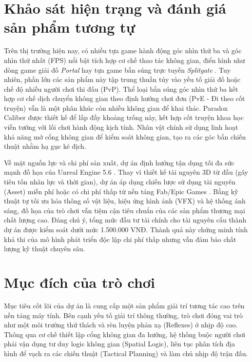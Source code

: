 \documentclass[../DoAn.tex]{subfiles}
\begin{document}
\section{Khảo sát hiện trạng và đánh giá sản phẩm tương tự}
\label{section:2.1}
Trên thị trường hiện nay, có nhiều tựa game hành động góc nhìn thứ ba và góc nhìn thứ nhất (FPS) nổi bật tích hợp cơ chế thao tác không gian, điển hình như dòng game giải đố \textit{Portal} \cite{MetacriticPortal} hay tựa game bắn súng trực tuyến \textit{Splitgate} \cite{MetacriticSplitgate}. Tuy nhiên, phần lớn các sản phẩm này tập trung thuần túy vào yếu tố giải đố hoặc chế độ nhiều người chơi thi đấu (PvP). Thể loại bắn súng góc nhìn thứ ba kết hợp cơ chế dịch chuyển không gian theo định hướng chơi đơn (PvE - Đi theo cốt truyện) vẫn là một phân khúc còn nhiều không gian để khai thác. Paradox Caliber được thiết kế để lấp đầy khoảng trống này, kết hợp cốt truyện khoa học viễn tưởng với lối chơi hành động kịch tính. Nhân vật chính sử dụng linh hoạt khả năng mở cổng không gian để kiểm soát không gian, tạo ra các góc bắn chiến thuật nhằm hạ gục kẻ địch.

Về mặt nguồn lực và chi phí sản xuất, dự án định hướng tận dụng tối đa sức mạnh đồ họa của Unreal Engine 5.6 \cite{UE56Doc}. Thay vì thiết kế tài nguyên 3D từ đầu (gây tiêu tốn nhân lực và thời gian), dự án áp dụng chiến lược sử dụng tài nguyên (Asset) miễn phí hoặc có chi phí thấp từ nền tảng Fab/Epic Games \cite{EpicFab}. Bằng kỹ thuật tự tối ưu hóa thông số vật liệu, hiệu ứng hình ảnh (VFX) và hệ thống ánh sáng, đồ họa của trò chơi vẫn tiệm cận tiêu chuẩn của các sản phẩm thương mại chất lượng cao. Đáng chú ý, tổng mức đầu tư tài chính cho tài nguyên cấu thành dự án được kiểm soát dưới mức 1.500.000 VNĐ. Thành quả này chứng minh tính khả thi của mô hình phát triển độc lập chi phí thấp nhưng vẫn đảm bảo chất lượng kỹ thuật chuyên sâu.

\section{Mục đích của trò chơi}
\label{section:2.2}
Mục tiêu cốt lõi của dự án là cung cấp một sản phẩm giải trí tương tác cao trên nền tảng máy tính. Bên cạnh yếu tố giải trí thông thường, trò chơi đóng vai trò như một môi trường thử thách và rèn luyện phản xạ (Reflexes) ở nhịp độ cao. Thông qua cơ chế thiết lập cổng không gian đa hướng, hệ thống buộc người chơi phải vận dụng tư duy logic không gian (Spatial Logic), liên tục phân tích địa hình để vạch ra các chiến thuật (Tactical Planning) và làm chủ nhịp độ trận đấu.
\end{document}
